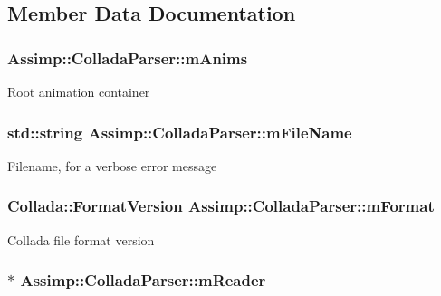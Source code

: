 \subsection{Member Data Documentation}
\hypertarget{class_assimp_1_1_collada_parser_a4cf75e2eba91d97c265b165e30bcb220}{
\subsubsection[{m\+Anims}]{ Assimp\+::\+Collada\+Parser\+::m\+Anims\hspace{0.3cm}{\ttfamily [protected]}}}\label{class_assimp_1_1_collada_parser_a4cf75e2eba91d97c265b165e30bcb220}
Root animation container \hypertarget{class_assimp_1_1_collada_parser_afcdf4ce3664ba28ccc83c3e3e186bca7}{
\subsubsection[{m\+File\+Name}]{\setlength{\rightskip}{0pt plus 5cm}std\+::string Assimp\+::\+Collada\+Parser\+::m\+File\+Name\hspace{0.3cm}{\ttfamily [protected]}}}\label{class_assimp_1_1_collada_parser_afcdf4ce3664ba28ccc83c3e3e186bca7}
Filename, for a verbose error message \hypertarget{class_assimp_1_1_collada_parser_a519c82e2ac698efb01663da278ad2e40}{
\subsubsection[{m\+Format}]{\setlength{\rightskip}{0pt plus 5cm}Collada\+::\+Format\+Version Assimp\+::\+Collada\+Parser\+::m\+Format\hspace{0.3cm}{\ttfamily [protected]}}}\label{class_assimp_1_1_collada_parser_a519c82e2ac698efb01663da278ad2e40}
Collada file format version \hypertarget{class_assimp_1_1_collada_parser_a7a85f0a1e8a1cc3b057e2c9211b957c1}{
\subsubsection[{m\+Reader}]{$\ast$ Assimp\+::\+Collada\+Parser\+::m\+Reader\hspace{0.3cm}{\ttfamily [protected]}}}\label{class_assimp_1_1_collada_parser_a7a85f0a1e8a1cc3b057e2c9211b957c1}
